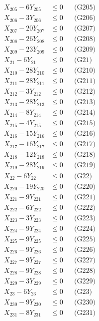 \documentclass[a4paper,10pt]{article}
\begin{document}
{\begin{align}
X_{205} - 6Y_{205} &\leq 0 && \text{(G205)} \\
\allowbreak
X_{206} - 3Y_{206} &\leq 0 && \text{(G206)} \\
X_{207} - 20Y_{207} &\leq 0 && \text{(G207)} \\
X_{208} - 26Y_{208} &\leq 0 && \text{(G208)} \\
X_{209} - 23Y_{209} &\leq 0 && \text{(G209)} \\
X_{21} - 6Y_{21} &\leq 0 && \text{(G21)} \\
X_{210} - 28Y_{210} &\leq 0 && \text{(G210)} \\
X_{211} - 28Y_{211} &\leq 0 && \text{(G211)} \\
X_{212} - 3Y_{212} &\leq 0 && \text{(G212)} \\
X_{213} - 28Y_{213} &\leq 0 && \text{(G213)} \\
X_{214} - 8Y_{214} &\leq 0 && \text{(G214)} \\
X_{215} - 4Y_{215} &\leq 0 && \text{(G215)} \\
X_{216} - 15Y_{216} &\leq 0 && \text{(G216)} \\
X_{217} - 16Y_{217} &\leq 0 && \text{(G217)} \\
X_{218} - 12Y_{218} &\leq 0 && \text{(G218)} \\
X_{219} - 28Y_{219} &\leq 0 && \text{(G219)} \\
X_{22} - 6Y_{22} &\leq 0 && \text{(G22)} \\
X_{220} - 19Y_{220} &\leq 0 && \text{(G220)} \\
X_{221} - 9Y_{221} &\leq 0 && \text{(G221)} \\
X_{222} - 6Y_{222} &\leq 0 && \text{(G222)} \\
X_{223} - 3Y_{223} &\leq 0 && \text{(G223)} \\
\allowbreak
X_{224} - 9Y_{224} &\leq 0 && \text{(G224)} \\
X_{225} - 9Y_{225} &\leq 0 && \text{(G225)} \\
X_{226} - 9Y_{226} &\leq 0 && \text{(G226)} \\
X_{227} - 9Y_{227} &\leq 0 && \text{(G227)} \\
X_{228} - 9Y_{228} &\leq 0 && \text{(G228)} \\
X_{229} - 3Y_{229} &\leq 0 && \text{(G229)} \\
X_{23} - 6Y_{23} &\leq 0 && \text{(G23)} \\
X_{230} - 9Y_{230} &\leq 0 && \text{(G230)} \\
X_{231} - 8Y_{231} &\leq 0 && \text{(G231)} \\

\end{align}}
\end{document}
